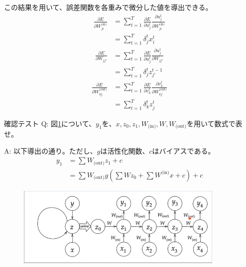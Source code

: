 \documentclass{ltjsarticle}
\begin{document}
この結果を用いて、誤差関数を各重みで微分した値を導出できる。
\begin{align}
  \frac{\partial E}{\partial W_{ji}^{\text{(in)}}} &= \sum_{t=1}^T \frac{\partial E}{\partial u_j^t} \frac{\partial u_j^t}{\partial W_{ji}^{\text{(in)}}}\\
  &= \sum_{t=1}^T \delta_j^t x_i^t
\end{align}
\begin{align}
  \frac{\partial E}{\partial W_{jj'}} &= \sum_{t=1}^T \frac{\partial E}{\partial u_j^t} \frac{\partial u_j^t}{\partial W_{jj'}}\\
  &= \sum_{t=1}^T \delta_j^t z_{j'}^{t-1}
\end{align}
\begin{align}
  \frac{\partial E}{\partial W_{kj}^{\text{(out)}}} &= \sum_{t=1}^T \frac{\partial E}{\partial v_k^t} \frac{\partial v_k^t}{\partial W_{kj}^{\text{(out)}}}\\
  &= \sum_{t=1}^T \delta_k^t z_j^t
\end{align}

\begin{itembox}[l]{確認テスト}
  Q: 図\ref{fig:day3_07_1}について、$y_1$を、$x, z_0, z_1, W_{\text{(in)}}, W, W_{\text{(out)}}$を用いて数式で表せ。

  A: 以下導出の通り。ただし、$g$は活性化関数、$c$はバイアスである。
  \begin{align}
    y_1 &= \sum W_{\text{(out)}}z_1 + c\\
    &= \sum W_{\text{(out)}}g(\sum Wz_0 + \sum W^{\text{(in)}}x + c) + c
  \end{align}
\end{itembox}

\begin{figure}
  \centering
  \includegraphics[width=10cm]{./capture/confirm_test/day3_07_1.png}
  \caption{}
  \label{fig:day3_07_1}
\end{figure}
\end{document}
